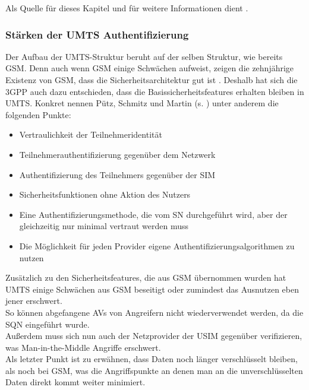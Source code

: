   Als Quelle für dieses Kapitel und für weitere Informationen dient \cite{3gpp.33.102}.
  
 \subsubsection{Stärken der UMTS Authentifizierung}
 Der Aufbau der \ac{UMTS}-Struktur beruht auf der selben Struktur, wie bereits \ac{GSM}.
 Denn auch wenn GSM einige Schwächen aufweist, zeigen die zehnjährige Existenz von GSM,
 dass die Sicherheitsarchitektur gut ist \cite{putz01}. Deshalb hat sich die \ac{3GPP} auch
 dazu entschieden, dass die Basis\-sicherheits\-features erhalten bleiben in UMTS. Konkret
 nennen Pütz, Schmitz und Martin (s. \cite{putz01}) unter anderem die folgenden Punkte:
 
 \begin{itemize}
  \item Vertraulichkeit der Teilnehmeridentität
  \item Teilnehmerauthentifizierung gegenüber dem Netzwerk
  \item Authentifizierung des Teilnehmers gegenüber der SIM
  \item Sicherheitsfunktionen ohne Aktion des Nutzers
  \item Eine Authentifizierungsmethode, die vom \ac{SN} durchgeführt wird, aber der gleichzeitig nur minimal vertraut werden muss
  \item Die Möglichkeit für jeden Provider eigene Authentifizierungsalgorithmen zu nutzen
 \end{itemize}
 
 Zusätzlich zu den Sicherheitsfeatures, die aus GSM übernommen wurden hat UMTS einige
 Schwächen aus GSM beseitigt oder zumindest das Ausnutzen eben jener erschwert. \\
 So können abgefangene \acp{AV} von Angreifern nicht wiederverwendet werden, da
 die SQN eingeführt wurde. \cite{putz01}\\
 Außerdem muss sich nun auch der Netzprovider der USIM gegenüber verifizieren, was
 Man-in-the-Middle Angriffe erschwert. \cite{putz01} \\
 Als letzter Punkt ist zu erwähnen, dass Daten noch länger verschlüsselt bleiben, als noch
 bei GSM, was die Angriffspunkte an denen man an die unverschlüsselten Daten direkt
 kommt weiter minimiert. \cite{spitz11}

